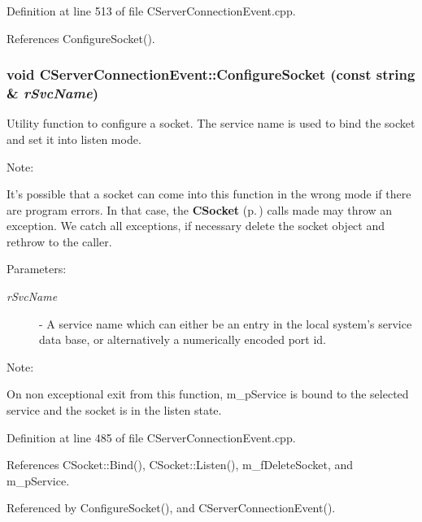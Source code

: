 Definition at line 513 of file CServer\-Connection\-Event.cpp.

References Configure\-Socket().
\subsubsection{\setlength{\rightskip}{0pt plus 5cm}void CServer\-Connection\-Event::Configure\-Socket (const string \& {\em r\-Svc\-Name})\hspace{0.3cm}{\tt  [protected]}}\label{classCServerConnectionEvent_b2}


Utility function to configure a socket. The service name is  used to bind the socket and set it into listen mode.

\begin{Desc}
\item[Note: ]\par
It's possible that a socket can come into this function in the wrong mode if there are program errors. In that case, the {\bf CSocket} {\rm (p.\,\pageref{classCSocket})} calls made may throw an exception. We catch all exceptions, if necessary delete the socket object and rethrow to the caller.\end{Desc}
\begin{Desc}
\item[Parameters: ]\par
\begin{description}
\item[{\em 
r\-Svc\-Name}]- A service name which can either be an entry in the local system's service data base, or alternatively a numerically encoded port id.\end{description}
\end{Desc}
\begin{Desc}
\item[Note: ]\par
On non exceptional exit from this function, m\_\-p\-Service is bound to the selected service and the socket is in the listen state. \end{Desc}


Definition at line 485 of file CServer\-Connection\-Event.cpp.

References CSocket::Bind(), CSocket::Listen(), m\_\-f\-Delete\-Socket, and m\_\-p\-Service.

Referenced by Configure\-Socket(), and CServer\-Connection\-Event().
